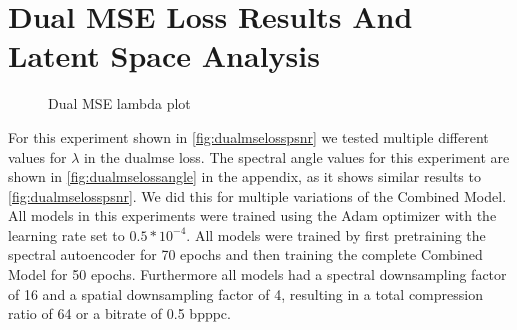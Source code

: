\section{Dual MSE Loss Results And Latent Space Analysis \label{sec:ch5dualmse}}
\begin{figure}
	\centering
	\datatable
	\caption{Dual MSE lambda plot}
	\label{fig:dualmselosspsnr}
	\end{figure}
For this experiment shown in \autoref{fig:dualmselosspsnr} we tested multiple different values for $\lambda$ in the \ac{dualmse} loss. The spectral angle values for this experiment are shown in \autoref{fig:dualmselossangle} in the appendix, as it shows similar results to \autoref{fig:dualmselosspsnr}. We did this for multiple variations of the Combined Model. All models in this experiments were trained using the Adam optimizer with the learning rate set to $0.5*10^{-4}$. All models were trained by first pretraining the spectral autoencoder for 70 epochs and then training the complete Combined Model for 50 epochs. Furthermore all models had a spectral downsampling factor of 16 and a spatial downsampling factor of 4, resulting in a total compression ratio of 64 or a bitrate of 0.5 \ac{bpppc}.

